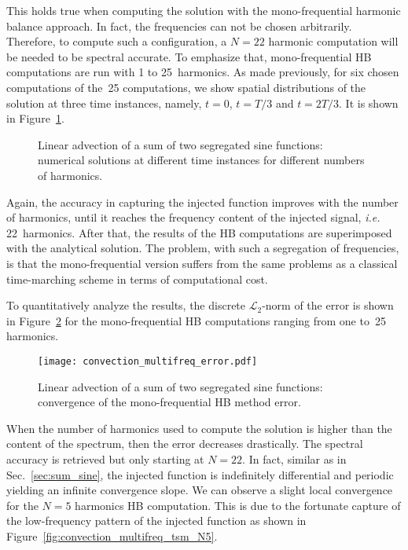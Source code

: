 This holds true when computing the solution with the mono-frequential
harmonic balance approach. In fact, the frequencies can not be chosen arbitrarily.
Therefore, to compute such a configuration, a $N=22$ harmonic computation
will be needed to be spectral accurate. To emphasize that, mono-frequential
HB computations are run with 1 to 25~harmonics.
As made previously, 
for six chosen computations of the~25 computations, 
we show spatial distributions of the solution
at three time instances, namely, $t=0$, $t=T/3$ and $t=2T/3$.
It is shown in Figure~\ref{fig:inj_multifreq_tsm}.
\begin{figure}[htp]
  \centering
  \caption{Linear advection of a sum of two segregated sine functions: 
  numerical solutions at different time instances for different numbers of harmonics.}
  \label{fig:inj_multifreq_tsm}
\end{figure}
Again, the accuracy in capturing the injected function
improves with the number of harmonics,
until it reaches the frequency content
of the injected signal, \emph{i.e.} 22~harmonics.
After that, the results of the HB computations are
superimposed with the analytical solution. 
The problem, with such a segregation of frequencies, is that 
the mono-frequential version suffers from the same
problems as a classical time-marching scheme in terms of 
computational cost.

To quantitatively analyze the results,
the discrete $\mathcal{L}_2$-norm of the error 
is shown in Figure~\ref{fig:conv_multifreq_tsm} for the
mono-frequential HB computations ranging from one to~25
harmonics.
\begin{figure}[htp]
  \centering
  \texttt{[image: convection\_multifreq\_error.pdf]}
  \caption{Linear advection of a sum of two segregated sine functions: convergence of the mono-frequential HB method error.}
  \label{fig:conv_multifreq_tsm}
\end{figure}
When the number of harmonics
used to compute the solution is higher than the content of the spectrum,
then the error decreases drastically. The spectral accuracy is retrieved
but only starting at $N=22$.
In fact, similar as in Sec.~\ref{sec:sum_sine},
the injected function is indefinitely differential and periodic
yielding an infinite convergence slope. We can observe a slight local convergence
for the $N=5$ harmonics HB computation. This is due to the fortunate 
capture of the low-frequency pattern of the injected function
as shown in Figure~\ref{fig:convection_multifreq_tsm_N5}.

